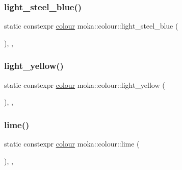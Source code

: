 \mbox{\label{classmoka_1_1colour_a74d7ec0257e479a7255c31c23f820759}} 
\subsubsection{\texorpdfstring{light\_steel\_blue()}{light\_steel\_blue()}}
{\footnotesize\ttfamily static constexpr \mbox{\hyperlink{classmoka_1_1colour}{colour}} moka\+::colour\+::light\+\_\+steel\+\_\+blue (\begin{DoxyParamCaption}{ }\end{DoxyParamCaption})\hspace{0.3cm}{\ttfamily [inline]}, {\ttfamily [static]}, {\ttfamily [noexcept]}}

\mbox{\label{classmoka_1_1colour_a1a9dea13046af27b7d1b43d9d4c5113d}} 
\subsubsection{\texorpdfstring{light\_yellow()}{light\_yellow()}}
{\footnotesize\ttfamily static constexpr \mbox{\hyperlink{classmoka_1_1colour}{colour}} moka\+::colour\+::light\+\_\+yellow (\begin{DoxyParamCaption}{ }\end{DoxyParamCaption})\hspace{0.3cm}{\ttfamily [inline]}, {\ttfamily [static]}, {\ttfamily [noexcept]}}

\mbox{\label{classmoka_1_1colour_a7337e615ca2d82c820e1cb12dcbfafba}} 
\subsubsection{\texorpdfstring{lime()}{lime()}}
{\footnotesize\ttfamily static constexpr \mbox{\hyperlink{classmoka_1_1colour}{colour}} moka\+::colour\+::lime (\begin{DoxyParamCaption}{ }\end{DoxyParamCaption})\hspace{0.3cm}{\ttfamily [inline]}, {\ttfamily [static]}, {\ttfamily [noexcept]}}

